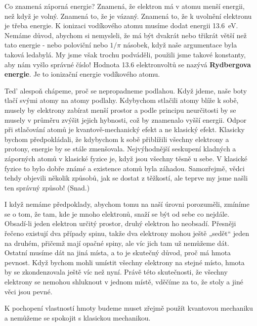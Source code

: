     Co znamená záporná energie? Znamená, že elektron má v atomu menší energii, než když je volný.
    Znamená to, že je vázaný. Znamená to, že k uvolnění elektronu je třeba energie. K ionizaci
    vodíkového atomu musíme dodat energii \qty{13.6}{\eV}. Nemáme důvod, abychom si nemysleli, že má
    být dvakrát nebo třikrát větší než tato energie - nebo poloviční nebo \(1/\pi\) násobek, když
    naše argumentace byla taková ledabylá. My jsme však trochu podváděli, použili jsme takové
    konstanty, aby nám vyšlo správné číslo! Hodnota \num{13.6} elektronvoltů se nazývá
    \textbf{Rydbergova energie}. Je to ionizační energie vodíkového atomu. 
    
    Ted' alespoň chápeme, proč se nepropadneme podlahou. Když jdeme, naše boty tlačí svými atomy na
    atomy podlahy. Kdybychom stlačili atomy blíže k sobě, musely by elektrony zabírat menší prostor
    a podle principu neurčitosti by se musely v průměru zvýšit jejich hybnosti, což by znamenalo
    vyšší energii. Odpor při stlačování atomů je kvantově-mechanický efekt a ne klasický efekt.
    Klasicky bychom předpokládali, že kdybychom k sobě přiblížili všechny elektrony a protony,
    energie by se stále zmenšovala. Nejvýhodnější seskupení kladných a záporných atomů v klasické
    fyzice je, když jsou všechny těsně u sebe. V klasické fyzice to bylo dobře známé a existence
    atomů byla záhadou. Samozřejmě, vědci tehdy objevili několik způsobů, jak se dostat z těžkostí,
    ale teprve my jsme našli ten správný způsob! (Snad.) 
    
    I když nemáme předpoklady, abychom tomu na naší úrovni porozuměli, zmíníme se o tom, že tam, kde
    je mnoho elektronů, snaží se být od sebe co nejdále. Obsadí-li jeden elektron určitý prostor,
    druhý elektron ho neobsadí. Přesněji řečeno existují dva případy spinu, takže dva elektrony
    mohou ještě „sedět“ jeden na druhém, přičemž mají opačné spiny, ale víc jich tam už nemůžeme
    dát. Ostatní musíme dát na jiná místa, a to je skutečný důvod, proč má hmota pevnost. Když
    bychom mohli umístit všechny elektrony na stejné místo, hmota by se zkondenzovala ještě víc než
    nyní. Právě této skutečnosti, že všechny elektrony se nemohou shluknout v jednom místě, vděčíme
    za to, že stoly a jiné věci jsou pevné. 
    
    K pochopení vlastností hmoty budeme muset zřejmě použít kvantovou mechaniku a nemůžeme se
    spokojit s klasickou mechanikou.
  
